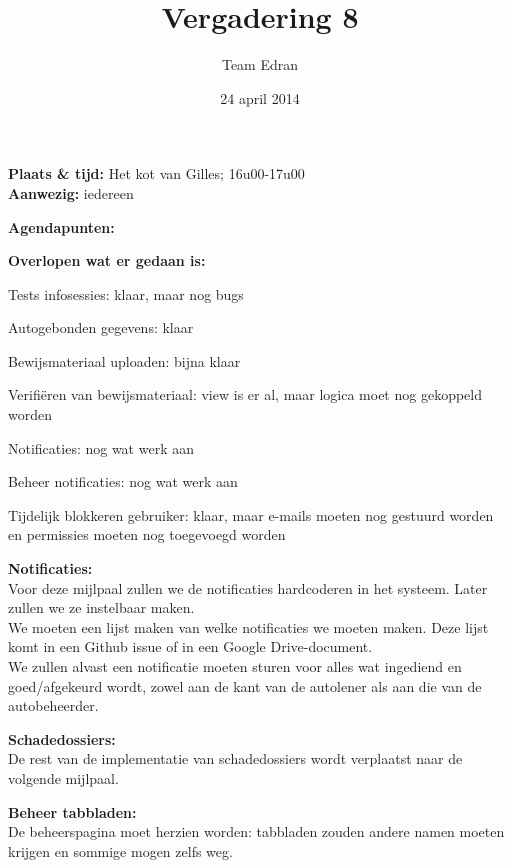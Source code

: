 \documentclass[11pt,a4paper,oneside]{article}
\title{Vergadering 8}
\author{Team Edran}
\date{24 april 2014}
\renewenvironment{itemize}[1]{\begin{compactitem}#1}{\end{compactitem}}
\begin{document}
\maketitle

\textbf{Plaats \& tijd:}
Het kot van Gilles; 16u00-17u00\\
\textbf{Aanwezig:} iedereen\par
\textbf{Agendapunten:}
\begin{itemize}
\item \textbf{Overlopen wat er gedaan is:}\\
\begin{itemize}
\item Tests infosessies: klaar, maar nog bugs
\item Autogebonden gegevens: klaar
\item Bewijsmateriaal uploaden: bijna klaar
\item Verifi\"eren van bewijsmateriaal: view is er al, maar logica moet nog gekoppeld worden
\item Notificaties: nog wat werk aan
\item Beheer notificaties: nog wat werk aan
\item Tijdelijk blokkeren gebruiker: klaar, maar e-mails moeten nog gestuurd worden en permissies moeten nog toegevoegd worden
\end{itemize}

\item \textbf{Notificaties:\\}
Voor deze mijlpaal zullen we de notificaties hardcoderen in het systeem. Later zullen we ze instelbaar maken.\\
We moeten een lijst maken van welke notificaties we moeten maken. Deze lijst komt in een Github issue of in een Google Drive-document.\\
We zullen alvast een notificatie moeten sturen voor alles wat ingediend en goed/afgekeurd wordt, zowel aan de kant van de autolener als aan die van de autobeheerder.

\item \textbf{Schadedossiers:\\}
De rest van de implementatie van schadedossiers wordt verplaatst naar de volgende mijlpaal.

\item \textbf{Beheer tabbladen:\\}
De beheerspagina moet herzien worden: tabbladen zouden andere namen moeten krijgen en sommige mogen zelfs weg.


\end{itemize}
\end{document}
